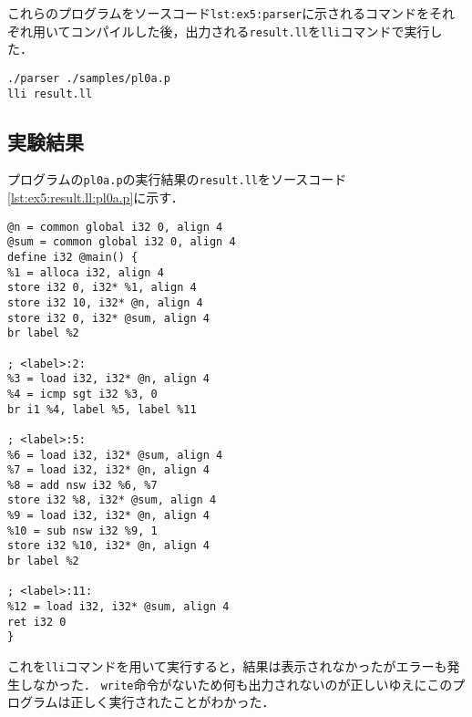 \documentclass[uplatex]{jsarticle}
\begin{document}
これらのプログラムをソースコード\verb#lst:ex5:parser#に示されるコマンドをそれぞれ用いてコンパイルした後，出力される\verb#result.ll#を\verb#lli#コマンドで実行した．
\begin{lstlisting}[caption=parserコマンド,label=lst:ex5:parser]
./parser ./samples/pl0a.p
lli result.ll
\end{lstlisting}

\subsection{実験結果}
プログラムの\verb#pl0a.p#の実行結果の\verb#result.ll#をソースコード\ref{lst:ex5:result.ll:pl0a.p}に示す．
\begin{lstlisting}[caption=condition句の処理,label=lst:ex5:result.ll:pl0a.p]
@n = common global i32 0, align 4
@sum = common global i32 0, align 4
define i32 @main() {
%1 = alloca i32, align 4
store i32 0, i32* %1, align 4
store i32 10, i32* @n, align 4
store i32 0, i32* @sum, align 4
br label %2

; <label>:2:
%3 = load i32, i32* @n, align 4
%4 = icmp sgt i32 %3, 0
br i1 %4, label %5, label %11

; <label>:5:
%6 = load i32, i32* @sum, align 4
%7 = load i32, i32* @n, align 4
%8 = add nsw i32 %6, %7
store i32 %8, i32* @sum, align 4
%9 = load i32, i32* @n, align 4
%10 = sub nsw i32 %9, 1
store i32 %10, i32* @n, align 4
br label %2

; <label>:11:
%12 = load i32, i32* @sum, align 4
ret i32 0
}
\end{lstlisting}
これを\verb#lli#コマンドを用いて実行すると，結果は表示されなかったがエラーも発生しなかった．
\verb#write#命令がないため何も出力されないのが正しいゆえにこのプログラムは正しく実行されたことがわかった．
\end{document}
